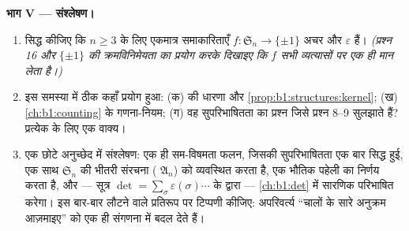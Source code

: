 \begin{problem}
\medskip \noindent\textbf{भाग V --- संश्लेषण।}
\begin{enumerate}[resume]
  \item सिद्ध कीजिए कि $n \geq 3$ के लिए एकमात्र  समाकारिताएँ $f \colon
  \mathfrak S_n \to \{\pm 1\}$ अचर  और $\varepsilon$ हैं।
  \emph{(प्रश्न 16 और $\{\pm1\}$ की क्रमविनिमेयता का प्रयोग करके दिखाइए कि
  $f$ सभी व्यत्यासों पर एक ही मान लेता है।)}
  \item इस समस्या में ठीक कहाँ प्रयोग हुआ: (क)  की धारणा और
  \cref{prop:b1:structures:kernel}; (ख) \cref{ch:b1:counting} के गणना-नियम;
  (ग) वह सुपरिभाषितता का प्रश्न जिसे प्रश्न 8--9 सुलझाते हैं? प्रत्येक के
  लिए एक वाक्य।
  \item एक छोटे अनुच्छेद में संश्लेषण: एक ही सम-विषमता फलन, जिसकी
  सुपरिभाषितता एक बार सिद्ध हुई, एक साथ $\mathfrak S_n$ की भीतरी संरचना
  ( $\mathfrak A_n$) को व्यवस्थित करता है, एक भौतिक पहेली का निर्णय
  करता है, और --- सूत्र $\det = \sum_\sigma \varepsilon(\sigma)\cdots$ के
  द्वारा --- \cref{ch:b1:det} में सारणिक परिभाषित करेगा। इस बार-बार लौटने
  वाले प्रतिरूप पर टिप्पणी कीजिए: अपरिवर्त्य ``चालों के सारे अनुक्रम
  आज़माइए'' को एक ही संगणना में बदल देते हैं।
\end{enumerate}
\end{problem}
